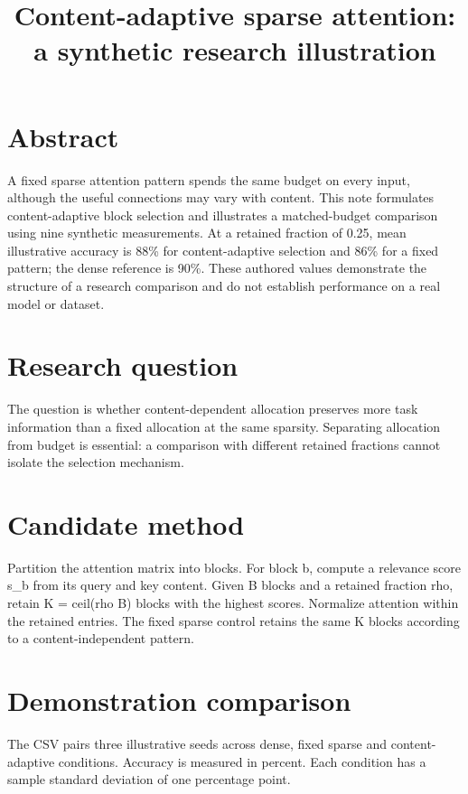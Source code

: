 \documentclass{article}
\title{Content-adaptive sparse attention: a synthetic research illustration}
\author{}
\date{}
\begin{document}
\maketitle

\section*{Abstract}

A fixed sparse attention pattern spends the same budget on every input, although the useful connections may vary with content. This note formulates content-adaptive block selection and illustrates a matched-budget comparison using nine synthetic measurements. At a retained fraction of 0.25, mean illustrative accuracy is 88\% for content-adaptive selection and 86\% for a fixed pattern; the dense reference is 90\%. These authored values demonstrate the structure of a research comparison and do not establish performance on a real model or dataset.

\section*{Research question}

The question is whether content-dependent allocation preserves more task information than a fixed allocation at the same sparsity. Separating allocation from budget is essential: a comparison with different retained fractions cannot isolate the selection mechanism.

\section*{Candidate method}

Partition the attention matrix into blocks. For block b, compute a relevance score s\_b from its query and key content. Given B blocks and a retained fraction rho, retain K = ceil(rho B) blocks with the highest scores. Normalize attention within the retained entries. The fixed sparse control retains the same K blocks according to a content-independent pattern.

\section*{Demonstration comparison}

The CSV pairs three illustrative seeds across dense, fixed sparse and content-adaptive conditions. Accuracy is measured in percent. Each condition has a sample standard deviation of one percentage point.
\end{document}
